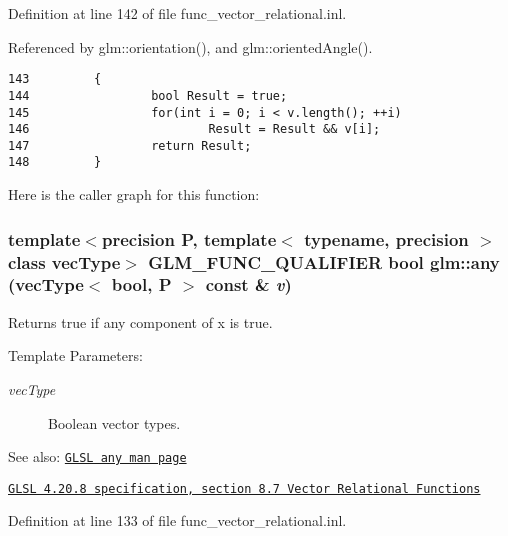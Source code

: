 Definition at line 142 of file func\_\-vector\_\-relational.inl.

Referenced by glm::orientation(), and glm::orientedAngle().

\begin{Code}\begin{verbatim}143         {
144                 bool Result = true;
145                 for(int i = 0; i < v.length(); ++i)
146                         Result = Result && v[i];
147                 return Result;
148         }
\end{verbatim}
\end{Code}




Here is the caller graph for this function:\hypertarget{group__core__func__vector__relational_ge1073be2b9f4c5ffa77eec25400e8121}{
\subsubsection[any]{\setlength{\rightskip}{0pt plus 5cm}template$<$precision P, template$<$ typename, precision $>$ class vecType$>$ GLM\_\-FUNC\_\-QUALIFIER bool glm::any (vecType$<$ bool, P $>$ const \& {\em v})}}
\label{group__core__func__vector__relational_ge1073be2b9f4c5ffa77eec25400e8121}


Returns true if any component of x is true.

\begin{Desc}
\item[Template Parameters:]
\begin{description}
\item[{\em vecType}]Boolean vector types.\end{description}
\end{Desc}
\begin{Desc}
\item[See also:]\href{http://www.opengl.org/sdk/docs/manglsl/xhtml/any.xml}{\tt GLSL any man page} 

\href{http://www.opengl.org/registry/doc/GLSLangSpec.4.20.8.pdf}{\tt GLSL 4.20.8 specification, section 8.7 Vector Relational Functions} \end{Desc}


Definition at line 133 of file func\_\-vector\_\-relational.inl.

